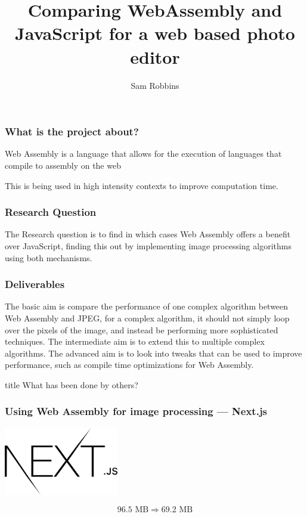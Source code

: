 \documentclass{beamer}
\title{Comparing WebAssembly and JavaScript for a web based photo editor}
\author{Sam Robbins}
\institute{Durham University}
\date{}
\begin{document}
\frame{\titlepage}

\begin{frame}
    \frametitle{What is the project about?}

    \begin{definition}
        Web Assembly is a language that allows for the execution of languages that compile to assembly on the web
    \end{definition}

    This is being used in high intensity contexts to improve computation time.
\end{frame}

\begin{frame}
    \frametitle{Research Question}
    The Research question is to find in which cases Web Assembly offers a benefit over JavaScript, finding this out by implementing image processing algorithms using both mechanisms.
\end{frame}

\begin{frame}
    \frametitle{Deliverables}
    The basic aim is compare the performance of one complex algorithm between Web Assembly and JPEG, for a complex algorithm, it should not simply loop over the pixels of the image, and instead be performing more sophisticated techniques. The intermediate aim is to extend this to multiple complex algorithms. The advanced aim is to look into tweaks that can be used to improve performance, such as compile time optimizations for Web Assembly.
\end{frame}

\begin{frame}
    \vfill
    \centering
    \begin{beamercolorbox}[sep=8pt,center,shadow=true,rounded=true]{title}
         What has been done by others?\par%
    \end{beamercolorbox}
    \vfill
\end{frame}

\begin{frame}
    \frametitle{Using Web Assembly for image processing — Next.js}
    \begin{center}
        \includegraphics[width=5cm]{nextjs.png}

    \end{center}

    $$
        96.5 \text{ MB} \Rightarrow 69.2 \text{ MB}
    $$
\end{frame}
\end{document}
